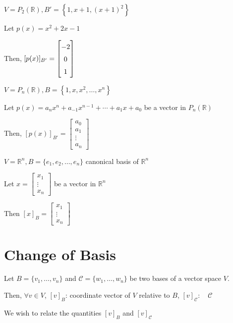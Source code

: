 \begin{example}
	$V = P_2(\mathbb{R}), B' = \left\{1, x+1, (x+1)^2\right\}$

	Let $p(x) = x^2 + 2x - 1$

	Then, $[p(x)]_{B'} = \renewcommand{\arraystretch}{1.5}\begin{bmatrix}
		-2\\0\\1
	\end{bmatrix}$
\end{example}

\begin{example}
	$V = P_n(\mathbb{R}), B = \left\{1,x,x^2,\ldots,x^n\right\}$

	Let $p(x) = a_nx^n + a_{-1}x^{n-1}+\cdots + a_1 x + a_0$ be a vector in $P_n(\mathbb{R})$

	Then, $[p(x)]_{B'} = \begin{bmatrix}
		a_0\\a_1\\\vdots\\a_n
	\end{bmatrix}$
\end{example}

\begin{example}
	$V = \mathbb{R}^n, B = \{e_1, e_2, \ldots, e_n\}$ canonical basis of $\mathbb{R}^n$

	Let $x = \begin{bmatrix}
		x_1\\\vdots\\x_n
	\end{bmatrix}$ be a vector in $\mathbb{R}^n$

	Then $[x]_B = \begin{bmatrix}
		x_1\\\vdots\\x_n
	\end{bmatrix}$
\end{example}

\section{Change of Basis}

Let $B = \{v_1, \ldots, v_n\}$ and $\mathcal{C} = \{w_1, \ldots, w_n\}$ be two bases of a vector space $V$.

Then, $\forall v \in V$, $[v]_B$: coordinate vector of $V$ relative to $B$, $[v]_\mathcal{C}$: ~ $\mathcal{C}$

We wish to relate the quantities $[v]_B$ and $[v]_\mathcal{C}$

